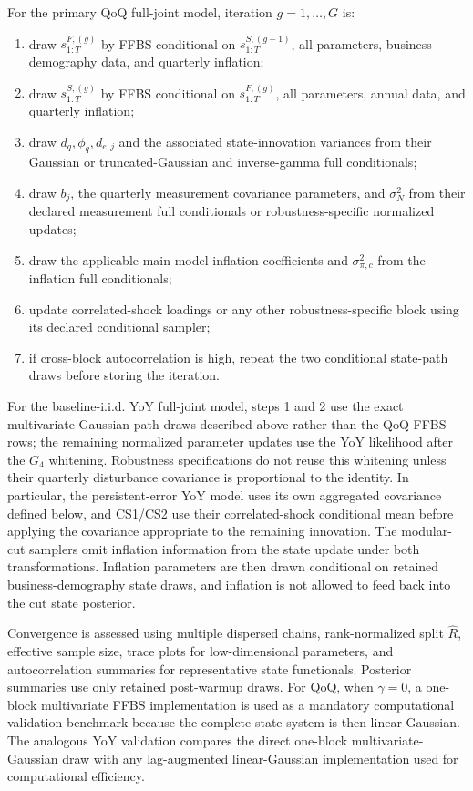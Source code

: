 \documentclass[11pt]{article}
\begin{document}
For the primary QoQ full-joint model, iteration \(g=1,\ldots,G\) is:
\begin{enumerate}
\item draw \(s_{1:T}^{F,(g)}\) by FFBS conditional on \(s_{1:T}^{S,(g-1)}\), all parameters, business-demography data, and quarterly inflation;
\item draw \(s_{1:T}^{S,(g)}\) by FFBS conditional on \(s_{1:T}^{F,(g)}\), all parameters, annual data, and quarterly inflation;
\item draw \(d_q,\phi_q,d_{e,j}\) and the associated state-innovation variances from their Gaussian or truncated-Gaussian and inverse-gamma full conditionals;
\item draw \(b_j\), the quarterly measurement covariance parameters, and \(\sigma_N^2\) from their declared measurement full conditionals or robustness-specific normalized updates;
\item draw the applicable main-model inflation coefficients and \(\sigma_{\pi,c}^2\) from the inflation full conditionals;
\item update correlated-shock loadings or any other robustness-specific block using its declared conditional sampler;
\item if cross-block autocorrelation is high, repeat the two conditional state-path draws before storing the iteration.
\end{enumerate}
For the baseline-i.i.d. YoY full-joint model, steps 1 and 2 use the exact multivariate-Gaussian path draws described above rather than the QoQ FFBS rows; the remaining normalized parameter updates use the YoY likelihood after the $G_4$ whitening. Robustness specifications do not reuse this whitening unless their quarterly disturbance covariance is proportional to the identity. In particular, the persistent-error YoY model uses its own aggregated covariance defined below, and CS1/CS2 use their correlated-shock conditional mean before applying the covariance appropriate to the remaining innovation. The modular-cut samplers omit inflation information from the state update under both transformations. Inflation parameters are then drawn conditional on retained business-demography state draws, and inflation is not allowed to feed back into the cut state posterior.

Convergence is assessed using multiple dispersed chains, rank-normalized split \(\widehat R\), effective sample size, trace plots for low-dimensional parameters, and autocorrelation summaries for representative state functionals. Posterior summaries use only retained post-warmup draws. For QoQ, when \(\gamma=0\), a one-block multivariate FFBS implementation is used as a mandatory computational validation benchmark because the complete state system is then linear Gaussian. The analogous YoY validation compares the direct one-block multivariate-Gaussian draw with any lag-augmented linear-Gaussian implementation used for computational efficiency.
\end{document}
